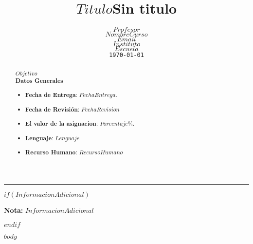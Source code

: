 \documentclass[11pt,a4paper]{scrartcl}			%
\title{$Titulo$}
\title{Sin titulo} %
\author{%
	$Profesor$ \\
	\textit{$NombreCurso$} \\
	\texttt{$Email$}\vspace{40pt} \\
	$Instituto$ \\
	$Escuela$ \\
	\texttt{\monthyeardate\today}
	}
\makeatletter
\def\printtitle{%
    {\centering \huge \normalfont \textbf{\@title}\par}}		%
\def\printauthor{%
    {\large \@author}}				%
\makeatother
\begin{document}
\begin{minipage}{0.35\linewidth}
	\begin{flushright}
		\printauthor
	\end{flushright}
\end{minipage} \hspace{0pt}
%
\begin{minipage}{0.02\linewidth}
	\rule{3pt}{175pt}
\end{minipage} \hspace{0pt}
%
\begin{minipage}{0.63\linewidth}
\printtitle 
\vspace{5pt}
	\begin{abstract} 
$Objetivo$ \\

\textbf{Datos Generales}
\begin{itemize}
\item \textbf{Fecha de Entrega}:  $FechaEntrega$. 
\item \textbf{Fecha de Revisión}: $FechaRevision$
\item \textbf{El valor de la asignacion}: $Porcentaje$\%.
\item \textbf{Lenguaje}: $Lenguaje$
\item \textbf{Recurso Humano}: $RecursoHumano$
\end{itemize}
	\end{abstract}
\end{minipage}
\vspace{20pt}		%


$if(InformacionAdicional)$

\textbf{Nota:}
$InformacionAdicional$

$endif$

\spanishsignitems


$body$
\end{document}
